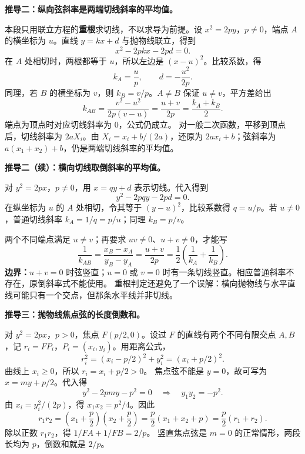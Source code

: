\clearpage
\begin{proofbox}
\textbf{推导二：纵向弦斜率是两端切线斜率的平均值。}
\begin{center}\end{center}
本段只用联立方程的\textbf{重根}求切线，不以求导为前提。设 $x^2=2py$，$p\ne0$，端点 $A$ 的横坐标为 $u$。直线 $y=kx+d$ 与抛物线联立，得到
\[
x^2-2pkx-2pd=0.
\]
在 $A$ 处相切时，两根都等于 $u$，所以左边是 $(x-u)^2$。比较系数，得
\[
k_A=\frac up,\qquad d=-\frac{u^2}{2p}.
\]
同理，若 $B$ 的横坐标为 $v$，则 $k_B=v/p$。$A\ne B$ 保证 $u\ne v$，平方差给出
\[
k_{AB}=\frac{v^2-u^2}{2p(v-u)}
=\frac{u+v}{2p}=\boxed{\frac{k_A+k_B}{2}}.
\]
端点为顶点时对应切线斜率为 $0$，公式仍成立。
对一般二次函数，平移到顶点后，切线斜率为 $2aX_i$。由 $X_i=x_i+b/(2a)$，还原为 $2ax_i+b$；弦斜率为 $a(x_1+x_2)+b$，仍是两端切线斜率的平均值。
\end{proofbox}

\clearpage
\begin{proofbox}
\textbf{推导二（续）：横向切线取倒斜率的平均值。}
\begin{center}\end{center}
对 $y^2=2px$，$p\ne0$，用 $x=qy+d$ 表示切线。代入得到
\[
y^2-2pqy-2pd=0.
\]
在纵坐标为 $u$ 的 $A$ 处相切，令其等于 $(y-u)^2$，比较系数得 $q=u/p$。若 $u\ne0$，普通切线斜率 $k_A=1/q=p/u$；同理 $k_B=p/v$。

两个不同端点满足 $u\ne v$；再要求 $uv\ne0$、$u+v\ne0$，才能写
\[
\frac1{k_{AB}}=\frac{x_B-x_A}{y_B-y_A}
=\frac{u+v}{2p}
=\boxed{\frac12\left(\frac1{k_A}+\frac1{k_B}\right)}.
\]
\textbf{边界：}$u+v=0$ 时弦竖直；$u=0$ 或 $v=0$ 时有一条切线竖直。相应普通斜率不存在，原倒斜率式不能使用。
重根判定还避免了一个误解：横向抛物线与水平直线可能只有一个交点，但那条水平线并非切线。
\end{proofbox}

\clearpage
\begin{proofbox}
\textbf{推导三：抛物线焦点弦的长度倒数和。}
\begin{center}\end{center}
对 $y^2=2px$，$p>0$，焦点 $F(p/2,0)$。设过 $F$ 的直线有两个不同有限交点 $A,B$，记 $r_i=FP_i$，$P_i=(x_i,y_i)$。用距离公式，
\[
r_i^2=(x_i-p/2)^2+y_i^2=(x_i+p/2)^2.
\]
曲线上 $x_i\ge0$，所以 $r_i=x_i+p/2>0$。
焦点弦不能是 $y=0$，故可写为 $x=my+p/2$。代入得
\[
y^2-2pmy-p^2=0\quad\Longrightarrow\quad y_1y_2=-p^2.
\]
由 $x_i=y_i^2/(2p)$，得 $x_1x_2=p^2/4$。因此
\[
r_1r_2=\left(x_1+\frac p2\right)\left(x_2+\frac p2\right)
=\frac p2(x_1+x_2+p)=\frac p2(r_1+r_2).
\]
除以正数 $r_1r_2$，得 $\boxed{1/FA+1/FB=2/p}$。
竖直焦点弦是 $m=0$ 的正常情形，两段长均为 $p$，倒数和就是 $2/p$。
\end{proofbox}

